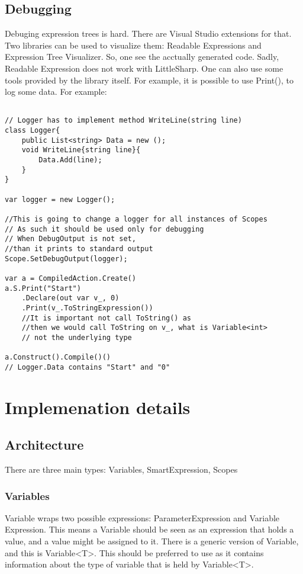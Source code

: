 \subsection{Debugging}
Debuging expression trees is hard. There are Visual Studio extensions for that. Two libraries can be used to visualize them: Readable Expressions and Expression Tree Visualizer. \cite{ExpressDebug} So, one see the acctually generated code. 
Sadly, Readable Expression does not work with LittleSharp. One can also use some tools provided by the library itself. For example, it is possible to use Print(), to log some data. For example:
\begin{lstlisting}

// Logger has to implement method WriteLine(string line)
class Logger{
    public List<string> Data = new ();
    void WriteLine{string line}{
        Data.Add(line);
    }
}

var logger = new Logger();

//This is going to change a logger for all instances of Scopes
// As such it should be used only for debugging
// When DebugOutput is not set, 
//than it prints to standard output
Scope.SetDebugOutput(logger);

var a = CompiledAction.Create()
a.S.Print("Start")
    .Declare(out var v_, 0)
    .Print(v_.ToStringExpression())
    //It is important not call ToString() as 
    //then we would call ToString on v_, what is Variable<int>
    // not the underlying type

a.Construct().Compile()()
// Logger.Data contains "Start" and "0"
\end{lstlisting}


\section{Implemenation details}
\subsection{Architecture}
There are three main types: Variables, SmartExpression, Scopes
\subsubsection{Variables}
Variable wraps two possible expressions: ParameterExpression and Variable Expression. This means a Variable should be seen as an expression that holds a value, and a value might be assigned to it. There is a generic version of Variable, and this is Variable<T>. This should be preferred to use as it contains information about the type of variable that is held by Variable<T>.



